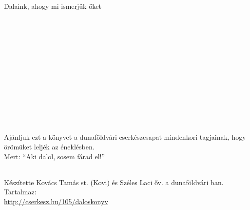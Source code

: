 
\begin{center}

~\\[\baselineskip]

{\large \cscs}
~\\[\baselineskip]

{\LARGE \textbf{\cim}}
~\\[\baselineskip]
~\\[\baselineskip]
\end{center}


\newpage
\mbox{}
\newpage

\begin{center}

~\\[\baselineskip]

{\LARGE \cscs}
~\\[\baselineskip]

{\Huge \textbf{\cim}} 
~\\[\baselineskip]
~\\[\baselineskip]
{\large Dalaink, ahogy mi ismerjük őket}

\end{center}

~\\[\baselineskip]
~\\[\baselineskip]
~\\[\baselineskip]
~\\[\baselineskip]
~\\[\baselineskip]
~\\[\baselineskip]
~\\[\baselineskip]
~\\[\baselineskip]
~\\[\baselineskip]
~\\[\baselineskip]
~\\[\baselineskip]
~\\[\baselineskip]
{\large
Ajánljuk ezt a könyvet a dunaföldvári cserkészcsapat mindenkori tagjainak, hogy örömüket leljék az éneklésben.
~\\[\baselineskip]
Mert: 
``Aki dalol, sosem fárad el!''
}
\newpage

{\large \cim}


~\\[\baselineskip]

Készítette Kovács Tamás st. (Kovi) és Széles Laci őv. a dunaföldvári \cscslong{}ban.
~\\[\baselineskip]
Tartalmaz:  \newline
~\\[\baselineskip]
\url{http://cserkesz.hu/105/daloskonyv}

